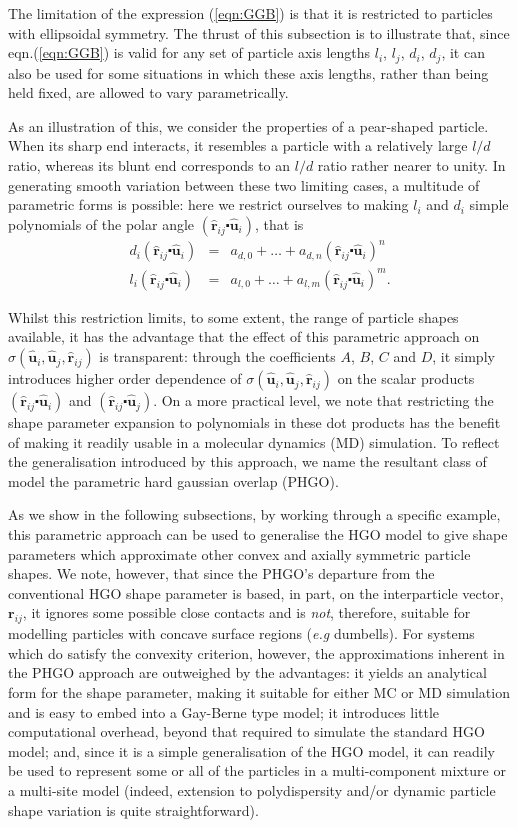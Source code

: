 \documentclass[%
reprint,
superscriptaddress,
showpacs,
 amsmath,amssymb,
 aps,
floatfix,
]{revtex4-1}
\newcommand{\vect}[1]{ \mathbf{#1} }
\newcommand{\vecth}[1]{ \mathbf{\hat{#1} } }
\newcommand{\rij}{\vecth{r}_{ij}}
\newcommand{\ui}{\vecth{u}_i}
\newcommand{\uj}{\vecth{u}_j}
\newcommand{\sijr}{\sigma(\ui,\uj,\rij)}
\newcommand{\dotProdP}[2]{ \left( #1 \centerdot #2 \right) }
\newcommand{\dotProd}[2]{ #1 \centerdot #2 }
\begin{document}
The limitation of the expression (\ref{eqn:GGB}) is that it is restricted to particles with
ellipsoidal symmetry. The thrust of this subsection is to illustrate that, since
eqn.(\ref{eqn:GGB}) is valid for any set of particle axis lengths $l_i$, $l_j$, $d_i$, $d_j$, it
can also be used for some situations in which these axis lengths, rather than being held fixed,
are allowed to vary parametrically.

As an illustration of this, we consider the properties of a pear-shaped particle. When its
sharp end interacts, it resembles a particle with a relatively large $l/d$ ratio, whereas its
blunt end corresponds to an $l/d$ ratio rather nearer to unity. In generating smooth variation
between these two limiting cases, a multitude of parametric forms is possible: here we restrict
ourselves to making $l_i$ and $d_i$ simple polynomials of the polar angle
$\dotProdP{\rij}{\ui}$, that is
\begin{eqnarray}
        d_i(\dotProd{\rij}{\ui}) &=& a_{d,0}
        +\ldots + a_{d,n}(\dotProd{\rij}{\ui})^n\\     \label{eqn:drui}
        l_i(\dotProd{\rij}{\ui}) &=& a_{l,0} +\ldots + a_{l,m}(\dotProd{\rij}{\ui})^m.
\end{eqnarray}

Whilst this restriction limits, to some extent, the range of particle shapes available, it has
the advantage that the effect of this parametric approach on $\sijr$ is transparent: through the
coefficients $A$, $B$, $C$ and $D$, it simply introduces higher order dependence of $\sijr$ on
the scalar products $\dotProdP{\rij}{\ui}$ and $\dotProdP{\rij}{\uj}$. On a more practical
level, we note that restricting the shape parameter expansion to polynomials in these dot
products has the benefit of making it readily usable in a molecular dynamics (MD) simulation. To
reflect the generalisation introduced by this approach, we name the resultant class of model the
parametric hard gaussian overlap (PHGO).

As we show in the following subsections, by working through a specific example, this parametric
approach can be used to generalise the HGO model to give shape parameters which approximate
other convex and axially symmetric particle shapes. We note, however, that since the PHGO's
departure from the conventional HGO shape parameter is based, in part, on the interparticle
vector, $\vect{r}_{ij}$, it ignores some possible close contacts and is {\em not}, therefore,
suitable for modelling particles with concave surface regions ({\em e.g} dumbells). For systems
which do satisfy the convexity criterion, however, the approximations inherent in the PHGO
approach are outweighed by the advantages: it yields an analytical form for the shape parameter,
making it suitable for either MC or MD simulation and is easy to embed into a Gay-Berne type
model; it introduces little computational overhead, beyond that required to simulate the
standard HGO model; and, since it is a simple generalisation of the HGO model, it can readily be
used to represent some or all of the particles in a multi-component mixture or a multi-site
model (indeed, extension to polydispersity and/or dynamic particle shape variation is quite
straightforward).
\end{document}
